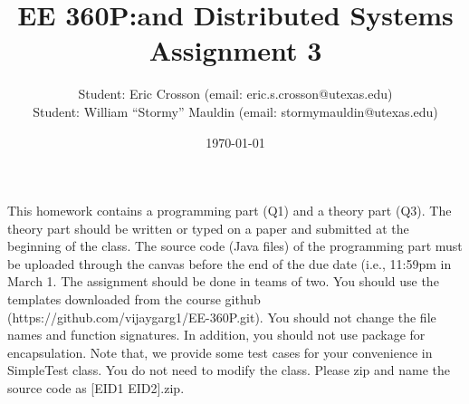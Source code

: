 \documentclass[11pt]{article}
\begin{document}
\title{EE 360P:\@Concurrent and Distributed Systems \\ Assignment 3}
\author{Student: Eric Crosson (email: eric.s.crosson@utexas.edu)\\
  Student: William ``Stormy'' Mauldin (email: stormymauldin@utexas.edu)}
\date{\today}
\maketitle

This homework contains a programming part (Q1) and a theory part (Q3). The
theory part should be written or typed on a paper and submitted at the beginning
of the class. The source code (Java files) of the programming part must be
uploaded through the canvas before the end of the due date (i.e., 11:59pm in
March 1. The assignment should be done in teams of two. You
should use the templates downloaded from the course github
(https://github.com/vijaygarg1/EE-360P.git). You should not change the file
names and function signatures. In addition, you should not use package for
encapsulation. Note that, we provide some test cases for your convenience in
SimpleTest class. You do not need to modify the class. Please zip and name the
source code as [EID1 EID2].zip. \\
\end{document}
